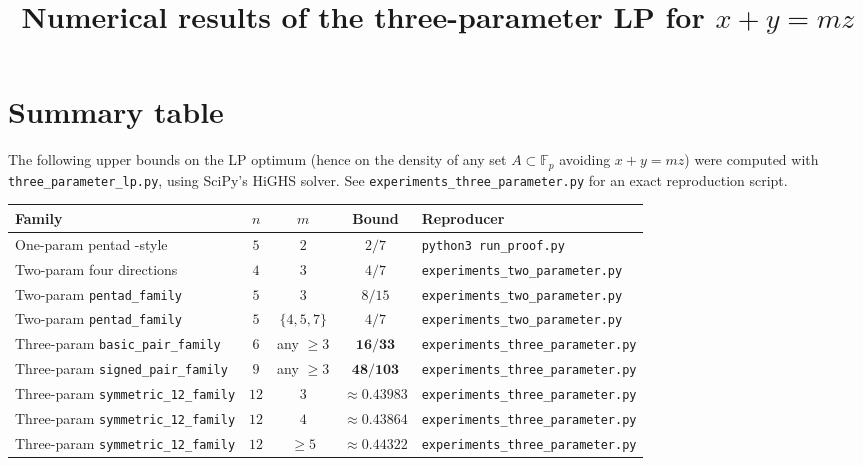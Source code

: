 \documentclass[11pt]{article}
\title{Numerical results of the three-parameter LP for $x+y=mz$}
\author{}
\date{}
\begin{document}
\maketitle

\section{Summary table}

The following upper bounds on the LP optimum (hence on the density of any
set $A\subset\mathbb{F}_p$ avoiding $x+y=mz$) were computed with
\texttt{three\_parameter\_lp.py}, using SciPy's HiGHS solver. See
\texttt{experiments\_three\_parameter.py} for an exact reproduction script.

\medskip

\noindent\begin{tabular}{l c c c l}
\toprule
Family                                           & $n$ & $m$           & Bound                & Reproducer                         \\
\midrule
One-param pentad \cite{LMPV}-style               & $5$ & $2$           & $2/7$                & \texttt{python3 run\_proof.py}      \\
Two-param four directions                        & $4$ & $3$           & $4/7$                & \texttt{experiments\_two\_parameter.py} \\
Two-param \texttt{pentad\_family}                & $5$ & $3$           & $8/15$               & \texttt{experiments\_two\_parameter.py} \\
Two-param \texttt{pentad\_family}                & $5$ & $\{4,5,7\}$   & $4/7$                & \texttt{experiments\_two\_parameter.py} \\
\midrule
Three-param \texttt{basic\_pair\_family}         & $6$ & any $\ge 3$   & $\mathbf{16/33}$     & \texttt{experiments\_three\_parameter.py} \\
Three-param \texttt{signed\_pair\_family}        & $9$ & any $\ge 3$   & $\mathbf{48/103}$    & \texttt{experiments\_three\_parameter.py} \\
Three-param \texttt{symmetric\_12\_family}       & $12$& $3$           & $\mathbf{\approx 0.43983}$ & \texttt{experiments\_three\_parameter.py} \\
Three-param \texttt{symmetric\_12\_family}       & $12$& $4$           & $\approx 0.43864$    & \texttt{experiments\_three\_parameter.py} \\
Three-param \texttt{symmetric\_12\_family}       & $12$& $\ge 5$       & $\approx 0.44322$    & \texttt{experiments\_three\_parameter.py} \\
\bottomrule
\end{tabular}
\end{document}
